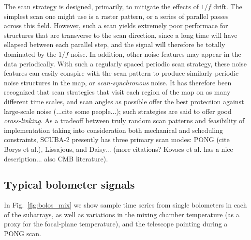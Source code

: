 \documentclass[useAMS,usenatbib,nofootinbib]{mn2e}
\begin{document}
The scan strategy is designed, primarily, to mitigate the effects of
$1/f$ drift. The simplest scan one might use is a raster pattern, or a
series of parallel passes across this field. However, such a scan
yields extremely poor performace for structures that are transverse to
the scan direction, since a long time will have ellapsed between each
parallel step, and the signal will therefore be totally dominated by
the $1/f$ noise. In addition, other noise features may appear in the
data periodically. With such a regularly spaced periodic scan
strategy, these noise features can easily conspire with the scan
pattern to produce similarly periodic noise structures in the map, or
\emph{scan-synchronous} noise. It has therefore been recognized that
scan strategies that visit each region of the map on as many different
time scales, and scan angles as possible offer the best protection
against large-scale noise (...cite some people...); such strategies
are said to offer good \emph{cross-linking}. As a tradeoff between
truly random scan patterns and feasibility of implementation taking
into consideration both mechanical and scheduling constraints, SCUBA-2
presently has three primary scan modes: PONG (cite Borys et al.),
Lissajous, and Daisy... (more citations? Kovacs et al. has a nice
description... also CMB literature).

\subsection{Typical bolometer signals}

In Fig.~\ref{fig:bolos_mix} we show sample time series from single
bolometers in each of the subarrays, as well as variations in the
mixing chamber temperature (as a proxy for the focal-plane
temperature), and the telescope pointing during a PONG scan.
\end{document}
